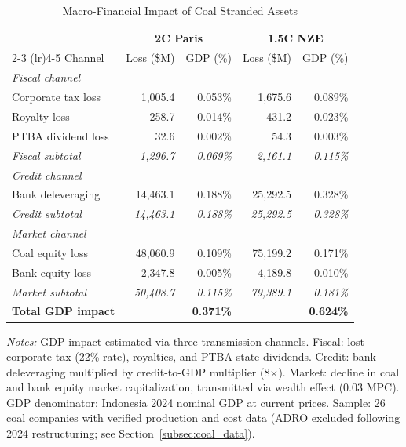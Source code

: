 \begin{table}[htbp]
\centering
\caption{Macro-Financial Impact of Coal Stranded Assets}
\label{tab:macro_impact}
\footnotesize
\begin{tabular}{lrrrr}
\toprule
 & \multicolumn{2}{c}{2\textdegree{}C Paris} & \multicolumn{2}{c}{1.5\textdegree{}C NZE} \\
\cmidrule(lr){2-3} \cmidrule(lr){4-5}
Channel & Loss (\$M) & GDP (\%) & Loss (\$M) & GDP (\%) \\
\midrule
  \textit{Fiscal channel} & & & & \\
  \quad Corporate tax loss & 1,005.4 & 0.053\% & 1,675.6 & 0.089\% \\
  \quad Royalty loss & 258.7 & 0.014\% & 431.2 & 0.023\% \\
  \quad PTBA dividend loss & 32.6 & 0.002\% & 54.3 & 0.003\% \\
  \quad \textit{Fiscal subtotal} & \textit{1,296.7} & \textit{0.069\%} & \textit{2,161.1} & \textit{0.115\%} \\[4pt]
  \textit{Credit channel} & & & & \\
  \quad Bank deleveraging & 14,463.1 & 0.188\% & 25,292.5 & 0.328\% \\
  \quad \textit{Credit subtotal} & \textit{14,463.1} & \textit{0.188\%} & \textit{25,292.5} & \textit{0.328\%} \\[4pt]
  \textit{Market channel} & & & & \\
  \quad Coal equity loss & 48,060.9 & 0.109\% & 75,199.2 & 0.171\% \\
  \quad Bank equity loss & 2,347.8 & 0.005\% & 4,189.8 & 0.010\% \\
  \quad \textit{Market subtotal} & \textit{50,408.7} & \textit{0.115\%} & \textit{79,389.1} & \textit{0.181\%} \\[4pt]
  \textbf{Total GDP impact} & & \textbf{0.371\%} & & \textbf{0.624\%} \\
\bottomrule
\end{tabular}

\smallskip
\noindent \textit{Notes:} GDP impact estimated via three transmission channels. Fiscal: lost corporate tax (22\% rate), royalties, and PTBA state dividends. Credit: bank deleveraging multiplied by credit-to-GDP multiplier (8$\times$). Market: decline in coal and bank equity market capitalization, transmitted via wealth effect (0.03 MPC). GDP denominator: Indonesia 2024 nominal GDP at current prices. Sample: 26 coal companies with verified production and cost data (ADRO excluded following 2024 restructuring; see Section~\ref{subsec:coal_data}).
\end{table}
